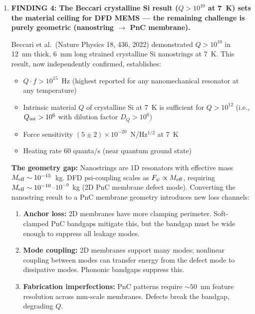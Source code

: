 \documentclass[11pt]{article}
\theoremstyle{definition}
\theoremstyle{remark}
\newcommand{\ee}[1]{\times 10^{#1}}
\newcommand{\honest}[1]{\textcolor{violet}{\textbf{HONEST ASSESSMENT:} #1}}
\begin{document}
\begin{tcolorbox}[colback=blue!5!white, colframe=blue!50!black,
  title=\textbf{W4i15 TOP 5 FINDINGS --- Ranked by Programme Impact}]
\begin{enumerate}
\honest{The $Q = 5.1\ee{7}$ is a room-temperature result.
The factor of $3$--$10\times$ improvement at 4~K is based on
measurements of conventional Si$_3$N$_4$ membranes (Tsaturyan
et al., 2017; Ghadimi et al., 2018), not the specific
topology-optimised geometry. The improvement could be larger
(if TLS is the dominant loss at room temperature in these
compact designs) or smaller (if radiation loss at the
supports dominates, which is temperature-independent). This
requires experimental verification.}

\item \textbf{FINDING 4: The Beccari crystalline Si result
($Q > 10^{10}$ at 7~K) sets the material ceiling for DFD
MEMS --- the remaining challenge is purely geometric
(nanostring $\to$ PnC membrane).}

Beccari et al.\ (Nature Physics 18, 436, 2022) demonstrated
$Q > 10^{10}$ in 12~nm thick, 6~mm long strained crystalline Si
nanostrings at 7~K. This result, now independently confirmed,
establishes:
\begin{itemize}[nosep]
\item $Q \cdot f > 10^{15}$~Hz (highest reported for any
  nanomechanical resonator at any temperature)
\item Intrinsic material $Q$ of crystalline Si at 7~K is
  sufficient for $Q > 10^{12}$ (i.e., $Q_{\rm int} > 10^6$
  with dilution factor $D_Q > 10^6$)
\item Force sensitivity $(5 \pm 2)\ee{-20}$~N/Hz$^{1/2}$ at
  7~K
\item Heating rate 60 quanta/s (near quantum ground state)
\end{itemize}

\textbf{The geometry gap:} Nanostrings are 1D resonators with
effective mass $M_{\rm eff} \sim 10^{-15}$~kg. DFD psi-coupling
scales as $F_\psi \propto M_{\rm eff}$, requiring $M_{\rm eff}
\sim 10^{-10}$--$10^{-9}$~kg (2D PnC membrane defect mode).
Converting the nanostring result to a PnC membrane geometry
introduces new loss channels:
\begin{enumerate}[nosep]
\item \textbf{Anchor loss:} 2D membranes have more clamping
  perimeter. Soft-clamped PnC bandgaps mitigate this, but the
  bandgap must be wide enough to suppress all leakage modes.
\item \textbf{Mode coupling:} 2D membranes support many modes;
  nonlinear coupling between modes can transfer energy from the
  defect mode to dissipative modes. Phononic bandgaps suppress
  this.
\item \textbf{Fabrication imperfections:} PnC patterns require
  $\sim 50$~nm feature resolution across mm-scale membranes.
  Defects break the bandgap, degrading $Q$.
\end{enumerate}


\end{enumerate}
\end{tcolorbox}
\end{document}
